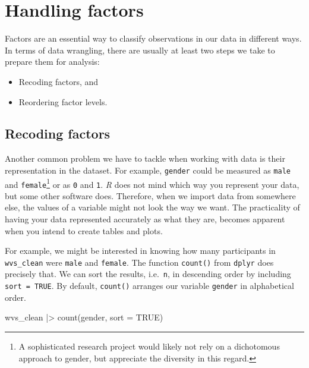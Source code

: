 \documentclass[
  letterpaper,
]{krantz}
\makeatletter
\newenvironment{Shaded}{\begin{snugshade}}{\end{snugshade}}
\newcommand{\AttributeTok}[1]{\textcolor[rgb]{0.40,0.45,0.13}{#1}}
\newcommand{\ConstantTok}[1]{\textcolor[rgb]{0.56,0.35,0.01}{#1}}
\newcommand{\FunctionTok}[1]{\textcolor[rgb]{0.28,0.35,0.67}{#1}}
\newcommand{\NormalTok}[1]{\textcolor[rgb]{0.00,0.23,0.31}{#1}}
\newcommand{\SpecialCharTok}[1]{\textcolor[rgb]{0.37,0.37,0.37}{#1}}
\newenvironment{kframe}{%
\medskip{}
\setlength{\fboxsep}{.8em}
 \def\at@end@of@kframe{}%
 \ifinner\ifhmode%
  \def\at@end@of@kframe{\end{minipage}}%
  \begin{minipage}{\columnwidth}%
 \fi\fi%
 \def\FrameCommand##1{\hskip\@totalleftmargin \hskip-\fboxsep
 \colorbox{shadecolor}{##1}\hskip-\fboxsep
     \hskip-\linewidth \hskip-\@totalleftmargin \hskip\columnwidth}%
 \MakeFramed {\advance\hsize-\width
   \@totalleftmargin\z@ \linewidth\hsize
   \@setminipage}}%
 {\par\unskip\endMakeFramed%
 \at@end@of@kframe}
\renewenvironment{Shaded}{\begin{kframe}}{\end{kframe}}
\makeatother
\begin{document}
\section{Handling factors}\label{sec-handling-factors}

Factors are an essential way to classify observations in our data in
different ways. In terms of data wrangling, there are usually at least
two steps we take to prepare them for analysis:

\begin{itemize}
\item
  Recoding factors, and
\item
  Reordering factor levels.
\end{itemize}

\subsection{Recoding factors}\label{sec-recoding-factors}

Another common problem we have to tackle when working with data is their
representation in the dataset. For example, \texttt{gender} could be
measured as \texttt{male} and \texttt{female}\footnote{A sophisticated
  research project would likely not rely on a dichotomous approach to
  gender, but appreciate the diversity in this regard.} or as \texttt{0}
and \texttt{1}. \emph{R} does not mind which way you represent your
data, but some other software does. Therefore, when we import data from
somewhere else, the values of a variable might not look the way we want.
The practicality of having your data represented accurately as what they
are, becomes apparent when you intend to create tables and plots.

For example, we might be interested in knowing how many participants in
\texttt{wvs\_clean} were \texttt{male} and \texttt{female}. The function
\texttt{count()} from \texttt{dplyr} does precisely that. We can sort
the results, i.e.~\texttt{n}, in descending order by including
\texttt{sort\ =\ TRUE}. By default, \texttt{count()} arranges our
variable \texttt{gender} in alphabetical order.

\begin{Shaded}
\begin{Highlighting}[]
\NormalTok{wvs\_clean }\SpecialCharTok{|\textgreater{}} \FunctionTok{count}\NormalTok{(gender, }\AttributeTok{sort =} \ConstantTok{TRUE}\NormalTok{)}
\end{Highlighting}
\end{Shaded}
\end{document}
